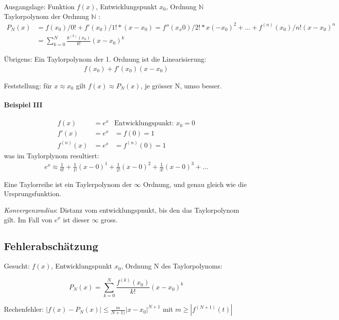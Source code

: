 Ausgangslage: Funktion $f(x)$, Entwicklungspunkt $x_0$, Ordnung $\mathbb{N}$ \\

Taylorpolynom der Ordnung $\mathbb{N}$ : 
\begin{align*}
P_N(x) &= f(x_0)/0! + f'(x_0)/1! * (x - x_0) = f''(x_x0) / 2! * x(-x_0)^2 + ... + f^(n)(x_0)/n! (x-x_0)^n \\
&= \sum^N_{k=0}{\frac{k^{(k)}(x_0)}{k!} (x-x_0)^k}
\end{align*}

Übrigens: Ein Taylorpolynom der 1. Ordnung ist die Linearisierung:
\begin{align*}
	f(x_0) + f'(x_0)(x-x_0)
\end{align*}

Feststellung: für $x \approx x_0$ gilt $f(x) \approx P_N(x)$, je grösser N, umso besser.


\paragraph{Beispiel III}

\begin{align*}
	f(x) &= e^x & \text{Entwicklungspunkt: } x_0=0 \\
	f'(x) &= e^x &= f(0) = 1\\
	f^{(n)}(x) &= e^x &= f^{(n)}(0) = 1
\end{align*}
was im Taylorplynom resultiert:
\begin{align*}
e^x \approx \frac{1}{0!} + \frac{1}{1!}(x-0)^1 + \frac{1}{2!}(x-0)^2 + \frac{1}{3!}(x-0)^3 + ...
\end{align*}

Eine Taylorreihe ist ein Taylerpolynom der $\infty$ Ordnung, und genau gleich wie die Ursprungsfunktion.

\emph{Konvergenzradius}: Distanz vom entwicklungspnukt, bis den das Taylorpolynom gilt. Im Fall von $e^x$ ist dieser $\infty$ gross.

\subsection{Fehlerabschätzung}

Gesucht: $f(x)$, Entwicklungspunkt $x_0$, Ordnung N des Taylorpolynoms:

\[
	P_N(x) = \sum^{N}_{k=0}{\frac{f^{(k)}(x_0)}{k!} (x-x_0)^k}
\]

Rechenfehler: $\left| f(x) - P_N(x) \right| \leq \frac{m}{N+1)} \left| x-x_0 \right|^{N+1}$ mit $m \geq \left| f^{(N+1)}(t) \right|$

